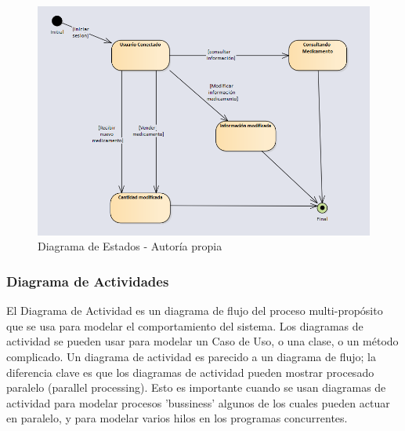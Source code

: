 \begin{center}
    \begin{figure}[htb]
        \centering
        \includegraphics[width = 0.8\linewidth] {libro/capitulo5/img/Estados.PNG}
        \caption{Diagrama de Estados - Autor\'ia propia}
    \end{figure}
\end{center}
\subsubsection{ Diagrama de Actividades}

El Diagrama de Actividad es un diagrama de flujo del proceso multi-propósito que se usa para modelar el comportamiento del sistema. Los diagramas de actividad se pueden usar para modelar un Caso de Uso, o una clase, o un método complicado.
\newline
Un diagrama de actividad es parecido a un diagrama de flujo; la diferencia clave es que los diagramas de actividad pueden mostrar procesado paralelo (parallel processing). Esto es importante cuando se usan diagramas de actividad para modelar procesos 'bussiness' algunos de los cuales pueden actuar en paralelo, y para modelar varios hilos en los programas concurrentes.

